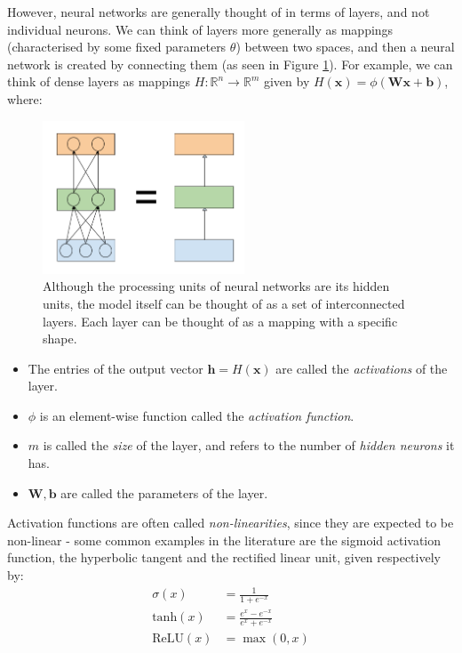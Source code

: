 \documentclass[pdftex,11pt,a4paper]{article}
\theoremstyle{definition}
\theoremstyle{remark}
\newcommand*{\V}[1]{\mathbf{#1}}%
\begin{document}
\par However, neural networks are generally thought of in terms of layers, and not individual neurons. We can think of layers more generally as mappings (characterised by some fixed parameters $\theta$) between two spaces, and then a neural network is created by connecting them (as seen in Figure \ref{fig:mlp}). For example, we can think of dense layers as mappings $H:\mathbb{R}^n \rightarrow \mathbb{R}^m$ given by $H(\V{x}) = \phi(\V{Wx}+\V{b})$, where:

\begin{figure}
    \centering
    \includegraphics[width=6cm]{figs/mlp.png}
    \caption{Although the processing units of neural networks are its hidden units, the model itself can be thought of as a set of interconnected layers. Each layer can be thought of as a mapping with a specific shape.}
    \label{fig:mlp}
\end{figure}

\begin{itemize}
    \item The entries of the output vector $\V{h} = H(\V{x})$ are called the \textit{activations} of the layer.
    \item $\phi$ is an element-wise function called the \textit{activation function}.
    \item $m$ is called the \textit{size} of the layer, and refers to the number of \textit{hidden neurons} it has.
    \item $\V{W, b}$ are called the parameters of the layer.
\end{itemize}

\par Activation functions are often called \textit{non-linearities}, since they are expected to be non-linear - some common examples in the literature are the sigmoid activation function, the hyperbolic tangent and the rectified linear unit, given respectively by:
\begin{align*}
    \sigma(x) &= \frac{1}{1+e^{-x}}\\
    \text{tanh}(x) &= \frac{e^x - e^{-x}}{e^x + e^{-x}}\\
    \text{ReLU}(x) &= \max(0, x)
\end{align*}
\end{document}
